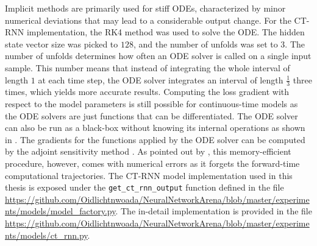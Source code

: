 \documentclass[draft,final]{vutinfth} %
\begin{document}
    Implicit methods are primarily used for stiff ODEs, characterized by minor numerical deviations that may lead to a considerable output change.
    For the CT-RNN implementation, the RK4 method was used to solve the ODE. The hidden state vector size was picked to $128$, and the number of unfolds was set to $3$.
    The number of unfolds determines how often an ODE solver is called on a single input sample. This number means that instead of integrating the whole interval of length $1$ at each time step, the ODE solver integrates an interval of length $\frac{1}{3}$ three times, which yields more accurate results.
    Computing the loss gradient with respect to the model parameters is still possible for continuous-time models as the ODE solvers are just functions that can be differentiated.
    The ODE solver can also be run as a black-box without knowing its internal operations as shown in \cite{NeuralODEs}.
    The gradients for the functions applied by the ODE solver can be computed by the adjoint sensitivity method \cite{AdjointSensitivityMethod}.
    As pointed out by \cite[p. 3]{LTCNetworks}, this memory-efficient procedure, however, comes with numerical errors as it forgets the forward-time computational trajectories.
    The CT-RNN model implementation used in this thesis is exposed under the \texttt{get\_ct\_rnn\_output} function defined in the file \url{https://github.com/Oidlichtnwoada/NeuralNetworkArena/blob/master/experiments/models/model_factory.py}.
    The in-detail implementation is provided in the file \url{https://github.com/Oidlichtnwoada/NeuralNetworkArena/blob/master/experiments/models/ct_rnn.py}.
\end{document}
